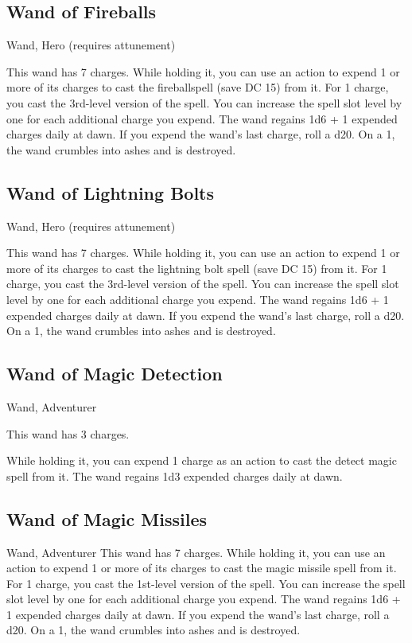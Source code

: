 \subsection{Wand of Fireballs}
Wand, Hero (requires attunement)

This wand has 7 charges. While holding it, you can use an action to expend 1 or more of its charges to cast the
fireballspell (save DC 15) from it. For 1 charge, you cast the 3rd-level version of the spell. You can increase the spell slot level by one for each additional charge you expend.
The wand regains 1d6 + 1 expended charges daily at dawn. If you expend the wand's last charge, roll a
d20. On a 1, the wand crumbles into ashes and is destroyed.

\subsection{Wand of Lightning Bolts}
Wand, Hero (requires attunement) 

This wand has 7 charges. While holding it, you can use an action to expend 1 or more of its charges to cast the lightning bolt spell (save DC 15) from it. For 1 charge, you cast the 3rd-level version of the spell. You can increase the spell slot level by one for each additional charge you expend.  The wand regains 1d6 + 1 expended charges daily at dawn. If you expend the wand's last charge, roll a d20. On a 1, the wand crumbles into ashes and is destroyed.

\subsection{Wand of Magic Detection}
Wand, Adventurer 

This wand has 3 charges. 

While holding it, you can expend 1 charge as an action to cast the detect magic spell from it. The wand regains 1d3 expended charges daily at dawn.

\subsection{Wand of Magic Missiles}
Wand, Adventurer This wand has 7 charges. While holding it, you can use an action to expend 1 or more of its charges to cast the magic missile spell from it. For 1 charge, you cast the 1st-level version of the spell. You can increase the spell slot level by one for each additional charge you expend.  The wand regains 1d6 + 1 expended charges daily at dawn. If you expend the wand's last charge, roll a d20. On a 1, the wand crumbles into ashes and is destroyed.

